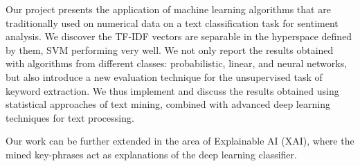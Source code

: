 Our project presents the application of machine learning algorithms that are traditionally used on numerical data on a text classification task for sentiment analysis. We discover the TF-IDF vectors are separable in the hyperspace defined by them, SVM performing very well. 
We not only report the results obtained with algorithms from different classes: probabilistic, linear, and neural networks, but also introduce a new evaluation technique for the unsupervised task of keyword extraction. We thus implement and discuss the results obtained using statistical approaches of text mining, combined with advanced deep learning techniques for text processing.

Our work can be further extended in the area of Explainable AI (XAI), where the mined key-phrases act as explanations of the deep learning classifier.